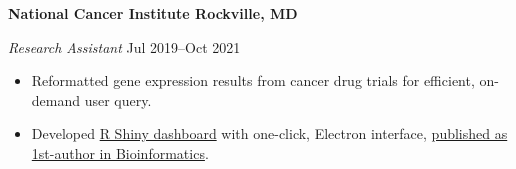 \textbf{National Cancer Institute \hfill Rockville, MD}\par

\textit{Research Assistant} \hfill Jul 2019--Oct 2021 \par
\begin{itemize}
	\item Reformatted gene expression results from cancer drug trials for efficient, on-demand user query.
	\item Developed \href{https://github.com/petezh/TP-Workbench}{R Shiny dashboard} with one-click, Electron interface, \href{https://academic.oup.com/bioinformatics/advance-article/doi/10.1093/bioinformatics/btab619/6358719?login=true}{published as 1st-author in Bioinformatics}.
\end{itemize}\par